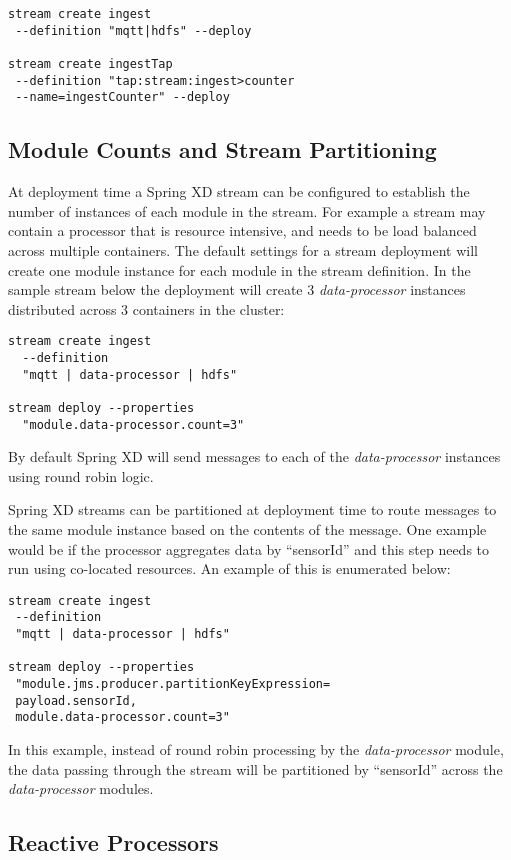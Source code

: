 \begin{lstlisting}
stream create ingest
 --definition "mqtt|hdfs" --deploy

stream create ingestTap
 --definition "tap:stream:ingest>counter
 --name=ingestCounter" --deploy
\end{lstlisting}

\subsection {Module Counts and Stream Partitioning}
At deployment time a Spring XD stream can be configured to establish the number
of instances of each module in the stream. For example a stream may contain
a processor that is resource intensive, and needs to be
load balanced across multiple containers. The default
settings for a stream deployment will create one module instance for each
module in the stream definition. In the sample stream below the
deployment will create 3 \emph{data-processor} instances distributed
across 3 containers in the cluster:

\begin{lstlisting}
stream create ingest
  --definition
  "mqtt | data-processor | hdfs"

stream deploy --properties
  "module.data-processor.count=3"
\end{lstlisting}

By default Spring XD will send messages to each of the \emph{data-processor}
instances using round robin logic.

Spring XD streams can be partitioned at deployment time to route messages to the
same module instance based on the contents of the message. One example
would be if the processor aggregates data by ``sensorId'' and this step needs to
run using co-located resources.  An example of this is enumerated below:

\begin{lstlisting}
stream create ingest
 --definition
 "mqtt | data-processor | hdfs"

stream deploy --properties
 "module.jms.producer.partitionKeyExpression=
 payload.sensorId,
 module.data-processor.count=3"
\end{lstlisting}

In this example, instead of round robin processing by the \emph{data-processor}
module, the data passing through the stream will be partitioned by ``sensorId''
across the \emph{data-processor} modules.

\subsection {Reactive Processors}

